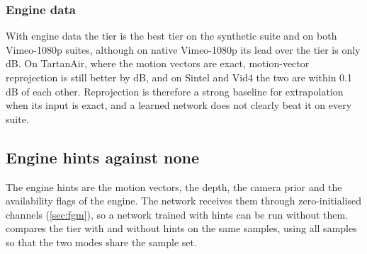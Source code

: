\subsubsection{Engine data}\label{sec:fgr-extrap-engine}


\Preliminary{} With engine data the  tier is the best tier on the synthetic suite and on both Vimeo-1080p suites, although on native Vimeo-1080p its lead over the  tier is only  dB. On TartanAir, where the motion vectors are exact, motion-vector reprojection is still better by  dB, and on Sintel and Vid4 the two are within 0.1 dB of each other. Reprojection is therefore a strong baseline for extrapolation when its input is exact, and a learned network does not clearly beat it on every suite.

\subsection{Engine hints against none}\label{sec:fgr-engine-hints}

The engine hints are the motion vectors, the depth, the camera prior and the availability flags of the engine. The network receives them through zero-initialised channels (\cref{sec:fgm}), so a network trained with hints can be run without them.  compares the  tier with and without hints on the same samples, using all samples so that the two modes share the sample set.

